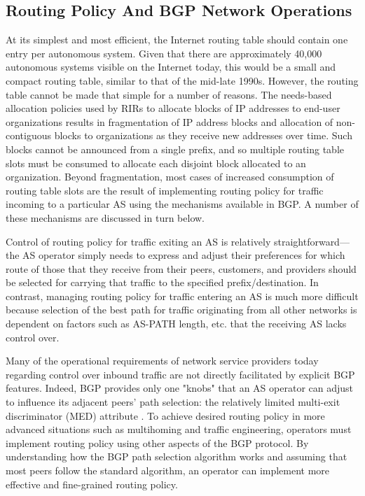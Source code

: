 \subsection{Routing Policy And BGP Network Operations}

At its simplest and most efficient, the Internet routing table should contain one entry per autonomous system. Given that there are approximately 40,000 autonomous systems visible on the Internet today, this would be a small and compact routing table, similar to that of the mid-late 1990s. However, the routing table cannot be made that simple for a number of reasons. The needs-based allocation policies used by RIRs \cite{rfc2050} to allocate blocks of IP addresses to end-user organizations results in fragmentation of IP address blocks and allocation of non-contiguous blocks to organizations as they receive new addresses over time. Such blocks cannot be announced from a single prefix, and so multiple routing table slots must be consumed to allocate each disjoint block allocated to an organization. Beyond fragmentation, most cases of increased consumption of routing table slots are the result of implementing routing policy for traffic incoming to a particular AS using the mechanisms available in BGP. A number of these mechanisms are discussed in turn below.

Control of routing policy for traffic exiting an AS is relatively straightforward---the AS operator simply needs to express and adjust their preferences for which route of those that they receive from their peers, customers, and providers should be selected for carrying that traffic to the specified prefix/destination. In contrast, managing routing policy for traffic entering an AS is much more difficult because selection of the best path for traffic originating from all other networks is dependent on factors such as AS-PATH length, etc. that the receiving AS lacks control over.

Many of the operational requirements of network service providers today regarding control over inbound traffic are not directly facilitated by explicit BGP features. Indeed, BGP provides only one "knobs" that an AS operator can adjust to influence its adjacent peers' path selection: the relatively limited multi-exit discriminator (MED) attribute \cite{Beijnum:2002oq}. To achieve desired routing policy in more advanced situations such as multihoming and traffic engineering, operators must implement routing policy using other aspects of the BGP protocol. By understanding how the BGP path selection algorithm works and assuming that most peers follow the standard algorithm, an operator can implement more effective and fine-grained routing policy.

